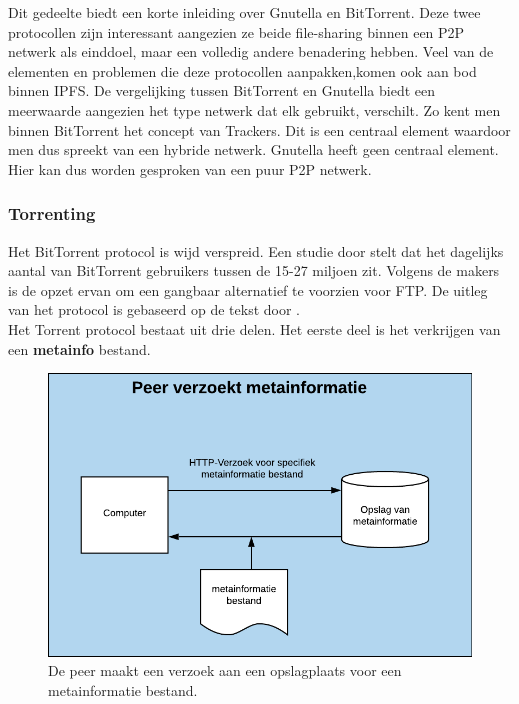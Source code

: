 Dit gedeelte biedt een korte inleiding over Gnutella en BitTorrent. Deze twee protocollen zijn interessant aangezien ze beide file-sharing binnen een P2P netwerk als einddoel, maar een volledig andere benadering hebben. Veel van de elementen en problemen die deze protocollen aanpakken,komen ook aan bod binnen IPFS. De vergelijking tussen BitTorrent en Gnutella biedt een meerwaarde aangezien het type netwerk dat elk gebruikt, verschilt. Zo kent men binnen BitTorrent het concept van Trackers. Dit is een centraal element waardoor men dus spreekt van een hybride netwerk. Gnutella heeft geen centraal element. Hier kan dus worden gesproken van een puur P2P netwerk.\\
 
 \subsubsection{Torrenting}
 \label{torrenting}
Het BitTorrent protocol is wijd verspreid. Een studie door \textcite{Wang2013} stelt dat het dagelijks aantal van BitTorrent gebruikers tussen de 15-27 miljoen zit. Volgens de makers is de opzet ervan om een gangbaar alternatief te voorzien voor FTP. De uitleg van het protocol is gebaseerd op de tekst door \textcite{Fonseca2005}.\\ 

Het Torrent protocol bestaat uit drie delen. Het eerste deel is het verkrijgen van een \textbf{metainfo} bestand.\\

\begin{figure}[h!]
\centering
\includegraphics[scale=.4]{torrent-1.png}
\caption[Peer metainformatie stap  - Torrenting 1]{De peer maakt een verzoek aan een opslagplaats voor een metainformatie bestand.}
\end{figure}

